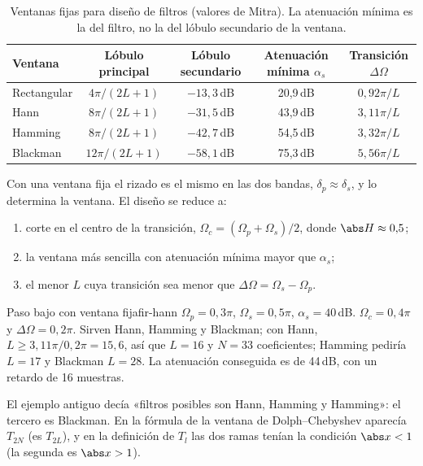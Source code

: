 \documentclass[11pt,a4paper]{scrartcl}
\begin{document}
\begin{table}[ht]
  \centering\small
  \caption{Ventanas fijas para diseño de filtros (valores de Mitra). La atenuación mínima es la del filtro, no la del lóbulo secundario de la ventana.}\label{tab:ventanas-fir}
  \begin{tabular}{@{}lcccc@{}}
    \toprule
    Ventana & Lóbulo principal & Lóbulo secundario & Atenuación mínima $\alpha_s$ & Transición $\Delta\Omega$\\\midrule
    Rectangular & $4\pi/(2L+1)$ & $-13{,}3$\,dB & 20,9\,dB & $0{,}92\pi/L$\\
    Hann & $8\pi/(2L+1)$ & $-31{,}5$\,dB & 43,9\,dB & $3{,}11\pi/L$\\
    Hamming & $8\pi/(2L+1)$ & $-42{,}7$\,dB & 54,5\,dB & $3{,}32\pi/L$\\
    Blackman & $12\pi/(2L+1)$ & $-58{,}1$\,dB & 75,3\,dB & $5{,}56\pi/L$\\\bottomrule
  \end{tabular}
\end{table}

Con una ventana fija el rizado es el mismo en las dos bandas, $\delta_p\approx\delta_s$, y lo determina la ventana. El diseño se reduce a:
\begin{enumerate}
  \item corte en el centro de la transición, $\Omega_c=(\Omega_p+\Omega_s)/2$, donde $\abs H\approx0{,}5$;
  \item la ventana más sencilla con atenuación mínima mayor que $\alpha_s$;
  \item el menor $L$ cuya transición sea menor que $\Delta\Omega=\Omega_s-\Omega_p$.
\end{enumerate}

\begin{ejemplo}{Paso bajo con ventana fija}{fir-hann}
  $\Omega_p=0{,}3\pi$, $\Omega_s=0{,}5\pi$, $\alpha_s=40$\,dB. $\Omega_c=0{,}4\pi$ y $\Delta\Omega=0{,}2\pi$. Sirven Hann, Hamming y Blackman; con Hann, $L\ge3{,}11\pi/0{,}2\pi=15{,}6$, así que $L=16$ y $N=33$ coeficientes; Hamming pediría $L=17$ y Blackman $L=28$. La atenuación conseguida es de 44\,dB, con un retardo de 16 muestras.
\end{ejemplo}

\begin{errata}
  El ejemplo antiguo decía «filtros posibles son Hann, Hamming y Hamming»: el tercero es Blackman. En la fórmula de la ventana de Dolph–Chebyshev aparecía $T_{2N}$ (es $T_{2L}$), y en la definición de $T_l$ las dos ramas tenían la condición $\abs x<1$ (la segunda es $\abs x>1$).
\end{errata}
\end{document}
